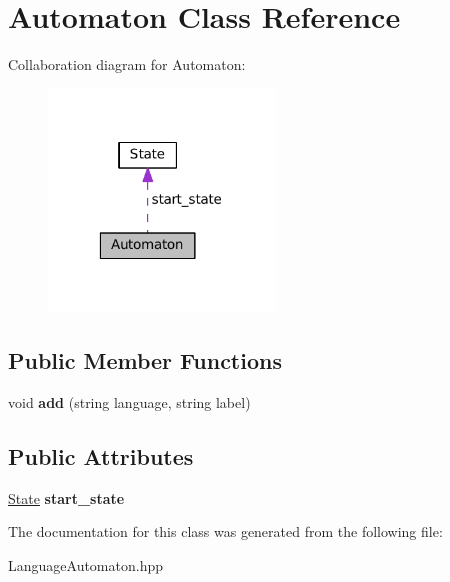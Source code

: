 \hypertarget{class_automaton}{\section{Automaton Class Reference}
\label{class_automaton}
}


Collaboration diagram for Automaton\-:\nopagebreak
\begin{figure}[H]
\begin{center}
\leavevmode
\includegraphics[width=171pt]{class_automaton__coll__graph}
\end{center}
\end{figure}
\subsection*{Public Member Functions}
\begin{DoxyCompactItemize}
\item 
\hypertarget{class_automaton_a0de94664120074c0dddda7830026732f}{void {\bfseries add} (string language, string label)}\label{class_automaton_a0de94664120074c0dddda7830026732f}

\end{DoxyCompactItemize}
\subsection*{Public Attributes}
\begin{DoxyCompactItemize}
\item 
\hypertarget{class_automaton_ab4569c4a3b161aa2d0134ca8e6eabdd4}{\hyperlink{class_state}{State} {\bfseries start\-\_\-state}}\label{class_automaton_ab4569c4a3b161aa2d0134ca8e6eabdd4}

\end{DoxyCompactItemize}


The documentation for this class was generated from the following file\-:\begin{DoxyCompactItemize}
\item 
Language\-Automaton.\-hpp\end{DoxyCompactItemize}

